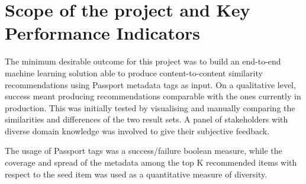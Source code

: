 
\section{Scope of the project and Key Performance Indicators}

The minimum desirable outcome for this project was to build an end-to-end machine learning solution able to produce content-to-content
similarity recommendations using Passport metadata tags as input. On a qualitative level, success meant producing recommendations
comparable with the ones currently in production. This was initially tested by visualising and manually comparing the similarities and differences
of the two result sets. A panel of stakeholders with diverse domain knowledge was involved to give their subjective feedback.

The usage of Passport tags was a success/failure boolean measure, while the coverage and spread of the metadata among the
top K recommended items with respect to the seed item was used as a quantitative measure of diversity.

